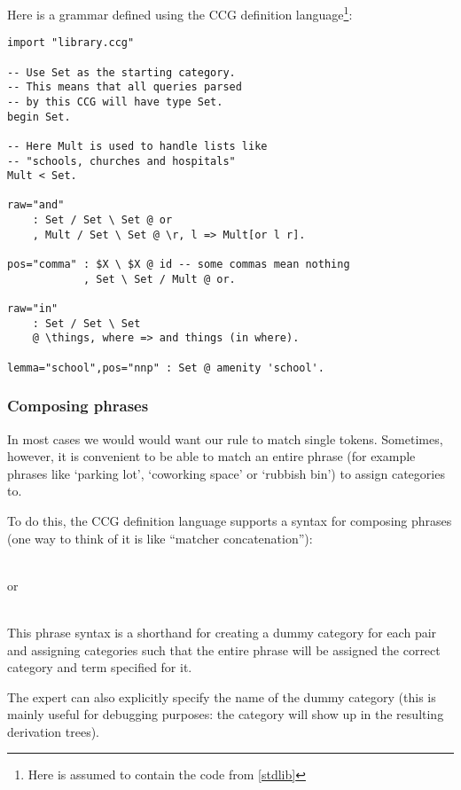 \documentclass[main.tex]{subfiles}
\begin{document}
\begin{example}
Here is a grammar defined using the CCG definition language\footnote{
    Here  is assumed to contain the code from \cref{stdlib}
}:
\begin{lstlisting}
import "library.ccg"

-- Use Set as the starting category.
-- This means that all queries parsed
-- by this CCG will have type Set.
begin Set.

-- Here Mult is used to handle lists like
-- "schools, churches and hospitals"
Mult < Set.

raw="and"
    : Set / Set \ Set @ or
    , Mult / Set \ Set @ \r, l => Mult[or l r].

pos="comma" : $X \ $X @ id -- some commas mean nothing
            , Set \ Set / Mult @ or.

raw="in"
    : Set / Set \ Set
    @ \things, where => and things (in where).

lemma="school",pos="nnp" : Set @ amenity 'school'.
\end{lstlisting}
\end{example}

\subsubsection{Composing phrases}
In most cases we would would want our rule to match single tokens. Sometimes,
however, it is convenient to be able to match an entire phrase (for example
phrases like `parking lot', `coworking space' or `rubbish bin') to assign
categories to.

To do this, the CCG definition language supports a syntax for composing phrases
(one way to think of it is like ``matcher concatenation''):
\begin{center}
     \code{<>}  \\
    or \\
       \\
\end{center}
This phrase syntax is a shorthand for creating a dummy category
for each pair and assigning categories such that the entire phrase will
be assigned the correct category and term specified for it.

The expert can also explicitly specify the name of the dummy category
(this is mainly useful for debugging purposes: the category will show up
in the resulting derivation trees).
\end{document}
